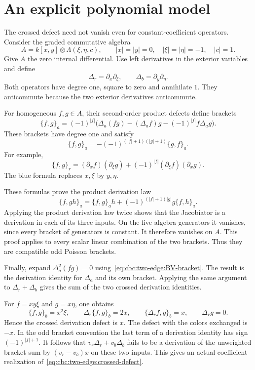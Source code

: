 \section{An explicit polynomial model}

The crossed defect need not vanish even for constant-coefficient operators.
Consider the graded commutative algebra
\[
 A=k[x,y]\otimes\Lambda(\xi,\eta,c),
 \qquad |x|=|y|=0,\quad |\xi|=|\eta|=-1,\quad |c|=1.
\]
Give $A$ the zero internal differential.
Use left derivatives in the exterior variables and define
\[
 \Delta_r=\partial_x\partial_\xi,
 \qquad \Delta_b=\partial_y\partial_\eta.
\]
Both operators have degree one, square to zero and annihilate $1$.
They anticommute because the two exterior derivatives anticommute.

For homogeneous $f,g\in A$, their second-order product defects define brackets
\begin{equation}\label{eq:cbc:two-edge:BV-bracket}
 \{f,g\}_a=(-1)^{|f|}
 \bigl(\Delta_a(fg)-(\Delta_af)g-(-1)^{|f|}f\Delta_ag\bigr).
\end{equation}
These brackets have degree one and satisfy
\[
 \{f,g\}_a=-(-1)^{(|f|+1)(|g|+1)}\{g,f\}_a.
\]
For example,
\[
 \{f,g\}_r=(\partial_xf)(\partial_\xi g)
              +(-1)^{|f|}(\partial_\xi f)(\partial_xg).
\]
The blue formula replaces $x,\xi$ by $y,\eta$.

These formulas prove the product derivation law
\[
 \{f,gh\}_a=\{f,g\}_ah+(-1)^{(|f|+1)|g|}g\{f,h\}_a.
\]
Applying the product derivation law twice shows that the Jacobiator is a derivation in each of its three inputs.
On the five algebra generators it vanishes, since every bracket of generators is constant.
It therefore vanishes on $A$.
This proof applies to every scalar linear combination of the two brackets.
Thus they are compatible odd Poisson brackets.

Finally, expand $\Delta_a^2(fg)=0$ using~\eqref{eq:cbc:two-edge:BV-bracket}.
The result is the derivation identity for $\Delta_a$ and its own bracket.
Applying the same argument to $\Delta_r+\Delta_b$ gives the sum of the two crossed derivation identities.

For $f=xy\xi$ and $g=x\eta$, one obtains
\[
 \{f,g\}_b=x^2\xi,\qquad
 \Delta_r\{f,g\}_b=2x,\qquad
 \{\Delta_rf,g\}_b=x,\qquad \Delta_rg=0.
\]
Hence the crossed derivation defect is $x$.
The defect with the colors exchanged is $-x$.
In the odd bracket convention the last term of a derivation identity has sign $(-1)^{|f|+1}$.
It follows that $v_r\Delta_r+v_b\Delta_b$ fails to be a derivation of the unweighted bracket sum by $(v_r-v_b)x$ on these two inputs.
This gives an actual coefficient realization of~\eqref{eq:cbc:two-edge:crossed-defect}.

